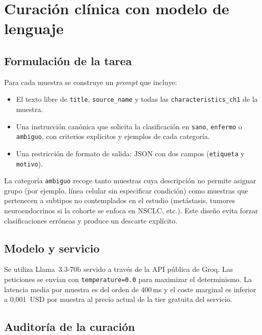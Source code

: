\section{Curación clínica con modelo de lenguaje}
\label{sec:curacion_llm}

\subsection{Formulación de la tarea}
\label{sec:tarea_llm}

Para cada muestra se construye un \emph{prompt} que incluye:

\begin{itemize}
  \item El texto libre de \texttt{title}, \texttt{source\_name} y todas las
  \texttt{characteristics\_ch1} de la muestra.
  \item Una instrucción canónica que solicita la clasificación en
  \texttt{sano}, \texttt{enfermo} o \texttt{ambiguo}, con criterios
  explícitos y ejemplos de cada categoría.
  \item Una restricción de formato de salida: JSON con dos campos
  (\texttt{etiqueta} y \texttt{motivo}).
\end{itemize}

La categoría \texttt{ambiguo} recoge tanto muestras cuya descripción no
permite asignar grupo (por ejemplo, línea celular sin especificar
condición) como muestras que pertenecen a subtipos no contemplados en el
estudio (metástasis, tumores neuroendocrinos si la cohorte se enfoca en
NSCLC, etc.). Este diseño evita forzar clasificaciones erróneas y produce
un descarte explícito.

\subsection{Modelo y servicio}
\label{sec:modelo_llm}

Se utiliza Llama~3.3-70b servido a través de la API pública de Groq. Las
peticiones se envían con \texttt{temperature=0.0} para maximizar el
determinismo. La latencia media por muestra es del orden de 400\,ms y el
coste marginal es inferior a 0,001~USD por muestra al precio actual de la
tier gratuita del servicio.

\subsection{Auditoría de la curación}
\label{sec:auditoria_curacion}


